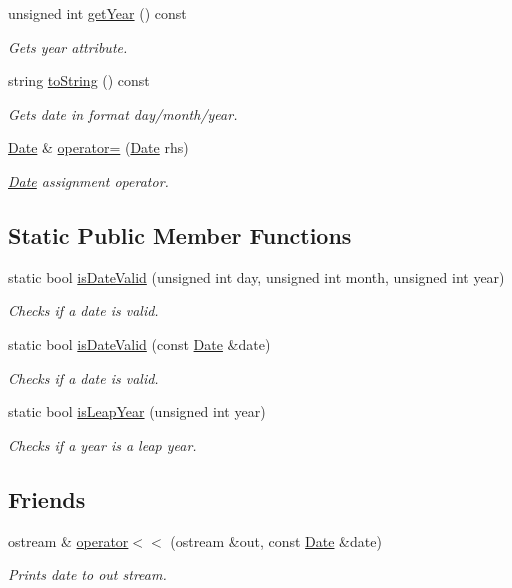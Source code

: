 \begin{DoxyCompactItemize}
unsigned int \hyperlink{class_date_a6561cf495bd6b7e6c747420d7ae9cc12}{get\+Year} () const 
\begin{DoxyCompactList}\small\item\em Gets year attribute. \end{DoxyCompactList}\item 
string \hyperlink{class_date_a78a793b6c55bb043789b09b1d74c1847}{to\+String} () const 
\begin{DoxyCompactList}\small\item\em Gets date in format day/month/year. \end{DoxyCompactList}\item 
\hyperlink{class_date}{Date} \& \hyperlink{class_date_a6835b4cfb6a3034a8daa0168c4e9d614}{operator=} (\hyperlink{class_date}{Date} rhs)
\begin{DoxyCompactList}\small\item\em \hyperlink{class_date}{Date} assignment operator. \end{DoxyCompactList}\end{DoxyCompactItemize}
\subsection*{Static Public Member Functions}
\begin{DoxyCompactItemize}
\item 
static bool \hyperlink{class_date_ad99ae04c84eceaf1374d9f6617ad07cd}{is\+Date\+Valid} (unsigned int day, unsigned int month, unsigned int year)
\begin{DoxyCompactList}\small\item\em Checks if a date is valid. \end{DoxyCompactList}\item 
static bool \hyperlink{class_date_a9e2bc98c0ff058974a3276b4501b1cf5}{is\+Date\+Valid} (const \hyperlink{class_date}{Date} \&date)
\begin{DoxyCompactList}\small\item\em Checks if a date is valid. \end{DoxyCompactList}\item 
static bool \hyperlink{class_date_a11e14d85e1039e5a7fab1444a57cf15b}{is\+Leap\+Year} (unsigned int year)
\begin{DoxyCompactList}\small\item\em Checks if a year is a leap year. \end{DoxyCompactList}\end{DoxyCompactItemize}
\subsection*{Friends}
\begin{DoxyCompactItemize}
\item 
ostream \& \hyperlink{class_date_a5c29d00ecf33e6d232a410f1f3d6eb70}{operator$<$$<$} (ostream \&out, const \hyperlink{class_date}{Date} \&date)
\begin{DoxyCompactList}\small\item\em Prints date to out stream. \end{DoxyCompactList}\end{DoxyCompactItemize}


